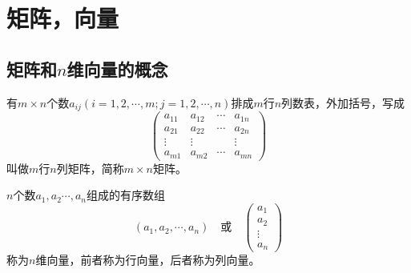 \section{矩阵，向量}

\subsection{矩阵和$n$维向量的概念}
\begin{definition}[矩阵]
    有$m\times n$个数$a_{ij}(i=1,2,\cdots,m;j=1,2,\cdots,n)$排成$m$行$n$列数表，外加括号，写成
    $$
    \left(\begin{array}{cccc}
    a_{11} & a_{12} & \cdots & a_{1 n} \\
    a_{21} & a_{22} & \cdots & a_{2 n} \\
    \vdots & \vdots & & \vdots \\
    a_{m 1} & a_{m 2} & \cdots & a_{m n}
    \end{array}\right)
    $$
    叫做$m$行$n$列矩阵，简称{\heiti $m\times n$矩阵}。
\end{definition}

\begin{definition}[$n$维向量]
    $n$个数$a_1,a_2\cdots,a_n$组成的有序数组
    $$(a_1,a_2,\cdots,a_n)\quad \mbox{或}  \quad   \left(\begin{array}{c}
        a_{1}  \\
        a_{2}  \\
        \vdots \\
        a_{n} 
        \end{array}\right)$$
    称为{\heiti $n$维向量}，前者称为{\heiti 行向量}，后者称为{\heiti 列向量}。
\end{definition}

